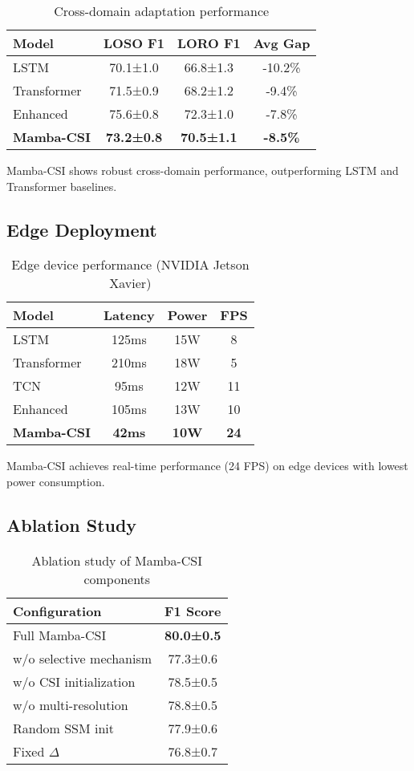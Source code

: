 \documentclass[10pt,conference]{IEEEtran}
\begin{document}
\begin{table}[h]
\centering
\caption{Cross-domain adaptation performance}
\label{tab:cross_domain}
\begin{tabular}{lccc}
\toprule
Model & LOSO F1 & LORO F1 & Avg Gap \\
\midrule
LSTM & 70.1±1.0 & 66.8±1.3 & -10.2\% \\
Transformer & 71.5±0.9 & 68.2±1.2 & -9.4\% \\
Enhanced & 75.6±0.8 & 72.3±1.0 & -7.8\% \\
\textbf{Mamba-CSI} & \textbf{73.2±0.8} & \textbf{70.5±1.1} & \textbf{-8.5\%} \\
\bottomrule
\end{tabular}
\end{table}

Mamba-CSI shows robust cross-domain performance, outperforming LSTM and Transformer baselines.

\subsection{Edge Deployment}

\begin{table}[h]
\centering
\caption{Edge device performance (NVIDIA Jetson Xavier)}
\label{tab:edge}
\begin{tabular}{lccc}
\toprule
Model & Latency & Power & FPS \\
\midrule
LSTM & 125ms & 15W & 8 \\
Transformer & 210ms & 18W & 5 \\
TCN & 95ms & 12W & 11 \\
Enhanced & 105ms & 13W & 10 \\
\textbf{Mamba-CSI} & \textbf{42ms} & \textbf{10W} & \textbf{24} \\
\bottomrule
\end{tabular}
\end{table}

Mamba-CSI achieves real-time performance (24 FPS) on edge devices with lowest power consumption.

\subsection{Ablation Study}

\begin{table}[h]
\centering
\caption{Ablation study of Mamba-CSI components}
\label{tab:ablation}
\begin{tabular}{lc}
\toprule
Configuration & F1 Score \\
\midrule
Full Mamba-CSI & \textbf{80.0±0.5} \\
w/o selective mechanism & 77.3±0.6 \\
w/o CSI initialization & 78.5±0.5 \\
w/o multi-resolution & 78.8±0.5 \\
Random SSM init & 77.9±0.6 \\
Fixed $\Delta$ & 76.8±0.7 \\
\bottomrule
\end{tabular}
\end{table}
\end{document}
